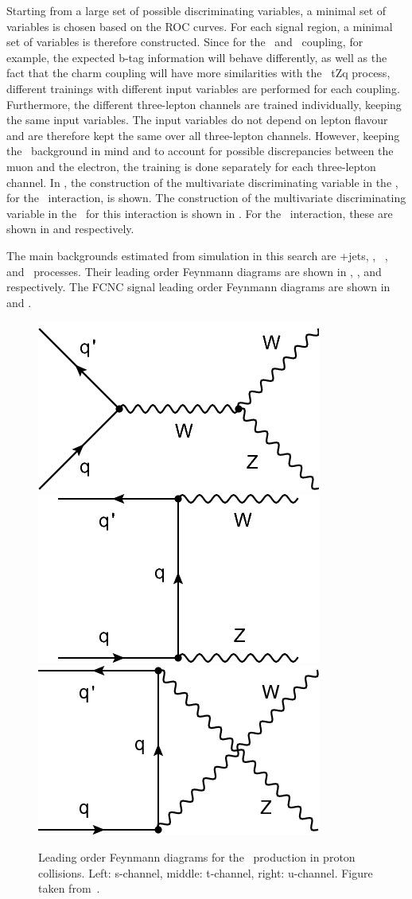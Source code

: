 Starting from a large set of possible discriminating variables, a minimal set of variables is chosen based on the ROC curves. For each signal region, a minimal set of variables is therefore constructed. Since for the \Zut\ and \Zct\ coupling, for example, the expected b-tag information will behave differently, as well as the fact that the charm coupling will have more similarities with the \SM\ tZq process, different trainings with different input variables are performed for each coupling. Furthermore, the different three-lepton channels are trained individually, keeping the same input variables. The input variables do not depend on lepton flavour and are therefore kept the same over all three-lepton channels. However, keeping the \NPL\ background in mind and to account for possible discrepancies between the muon and the electron, the training is done separately for each three-lepton channel. In , the construction of the multivariate discriminating variable in the \STSR, for the \Zut\ interaction, is shown. The construction of the multivariate discriminating variable in the \TTSR\ for this interaction is shown in . For the \Zct\ interaction, these are shown in  and  respectively. 

The main backgrounds estimated from simulation in this search are \WZ+jets, \ttZ, \SM\ \tZq, and \ZZ\ processes. Their leading order Feynmann diagrams are shown in ,  ,  and  respectively. The FCNC signal leading order Feynmann diagrams are shown in  and . 
\begin{figure}[htbp]
	\centering
	\includegraphics[width=0.3\linewidth]{6_Search/Figures/Feynman/WZa}
	\includegraphics[width=0.3\linewidth]{6_Search/Figures/Feynman/WZb}
	\includegraphics[width=0.3\linewidth]{6_Search/Figures/Feynman/WZc}
	\caption{Leading order Feynmann diagrams for the \WZ\ production in proton collisions. Left: s-channel, middle: t-channel, right: u-channel. Figure taken from~\cite{Khachatryan:2216557}.}
	\label{fig:WZ}
\end{figure}

